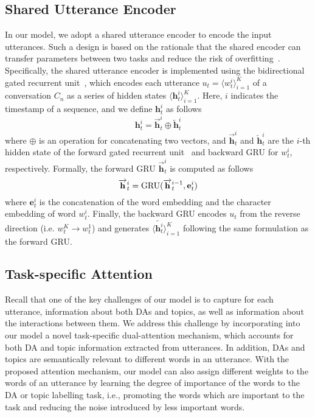 \documentclass[11pt,a4paper]{article}
\begin{document}
\subsection{Shared Utterance Encoder}
In our model, we adopt a shared utterance encoder to encode the input utterances.  Such a design is based on the rationale that the shared encoder can transfer parameters between two tasks and reduce the risk of overfitting~\cite{ruder2017overview}. 
Specifically, the shared utterance encoder is implemented using the bidirectional gated recurrent unit~\cite[BiGRU]{cho2014properties}, which encodes each utterance $u_{t} = \langle w_t^i \rangle_{i=1}^K $ of a conversation $C_{n}$ as a series of hidden states $\langle \mathbf{h}_t^i\rangle_{i=1}^K$. Here, $i$ indicates the timestamp of a sequence, and  we define $\mathbf{h}_t^i$ as follows 
\begin{equation} \label{eq:1}
\mathbf { h }_t^i = {  \overrightarrow { \mathbf { h } } _ t^i \oplus \overleftarrow  { \mathbf { h } } _ t^i }
\end{equation}
where $\oplus$ is an operation for concatenating two vectors, and $\overrightarrow { \mathbf { h } } _ t^i$ and $\overleftarrow  { \mathbf { h } } _ t^i$ are the $i$-th hidden state of the forward gated recurrent unit~\cite[GRU]{cho2014properties} and backward GRU for $w_t^i$, respectively. Formally, the forward GRU $\overrightarrow { \mathbf { h } } _ t^i$ is computed as follows 
\def\GRU{\mathop{\rm GRU}}
\begin{equation} \label{eq:2}
    \overrightarrow { \mathbf { h } } _ t^i = \GRU (\overrightarrow { \mathbf { h } } _ t^{i-1},\mathbf{e} _ t^i)
\end{equation}
where $\mathbf{e} _ t^i$ is the concatenation of the word embedding and the character embedding of word $w_t^i$. Finally, the backward GRU encodes \textbf{$u_t$} from the reverse direction (i.e. $w_t ^K  \rightarrow  w_t ^1$) and generates $\langle \overleftarrow{\mathbf{h}_t^i}\rangle_{i=1}^K$ following the same formulation as the forward GRU.


\subsection{Task-specific Attention} 

Recall that one of the key challenges of our model is to capture for each utterance, information about both DAs and topics, as well as information about the interactions between them. We address this challenge by incorporating into our model a novel task-specific dual-attention mechanism, which accounts for both DA and topic information extracted from utterances.   
In addition, DAs and topics are semantically relevant to  different words in an utterance. With the proposed attention mechanism, our model can also assign different weights to the words of an utterance by learning the degree of importance of the words to the DA or topic labelling task, i.e., promoting the words which are important to the task and reducing the noise introduced by less important words.
\end{document}
